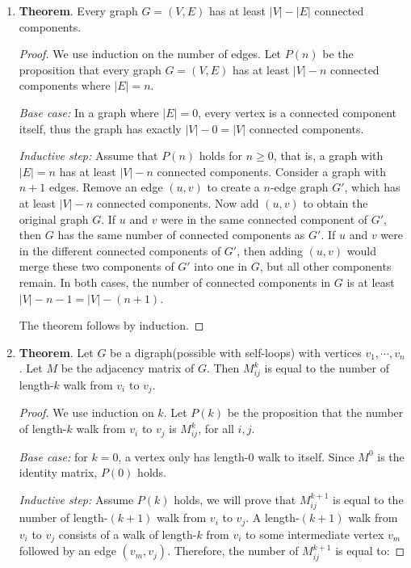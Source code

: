 \documentclass[11pt]{article}
\begin{document}
\begin{enumerate}
  \item 
    \textbf{Theorem}. Every graph $G=(V,E)$ has at least $|V|-|E|$
    connected components.
    \begin{proof}
      We use induction on the number of edges. Let $P(n)$ be the
      proposition that every graph $G=(V,E)$ has at least $|V|-n$
      connected components where $|E|=n$. 

      \emph{Base case:} In a graph where $|E|=0$, every vertex is a
      connected component itself, thus the graph has exactly
      $|V|-0=|V|$ connected components. 

      \emph{Inductive step:} Assume that $P(n)$ holds for $n \geq 0$,
      that is, a graph with $|E|=n$ has at least $|V|-n$ connected
      components. Consider a graph with $n+1$ edges. Remove an edge
      $(u,v)$ to create a $n$-edge graph $G'$, which has at least
      $|V|-n$ connected components. Now add $(u,v)$ to obtain the
      original graph $G$. If
      $u$ and $v$ were in the same connected component of $G'$, then
      $G$ has the same number of connected components as $G'$. If $u$
      and $v$ were in the different connected components of $G'$, then
      adding $(u,v)$ would merge these two components of $G'$ into one in
      $G$, but all other components remain. In both cases, the number
      of connected components in $G$ is at least $|V|-n-1=|V|-(n+1)$.

      The theorem follows by induction. 
    \end{proof}

  \item
    \textbf{Theorem}. Let $G$ be a digraph(possible with self-loops)
    with vertices $v_1, \cdots, v_n$. Let $M$ be the adjacency matrix
    of $G$. Then $M_{ij}^k$ is equal to the number of length-$k$ walk
    from $v_i$ to $v_j$.
    \begin{proof}
      We use induction on $k$. Let $P(k)$ be the proposition that the
      number of length-$k$ walk from $v_i$ to $v_j$ is $M_{ij}^k$, for
      all $i,j$. 

      \emph{Base case:} for $k=0$, a vertex only has length-$0$ walk
      to itself. Since $M^0$ is the identity matrix, $P(0)$ holds. 

      \emph{Inductive step:} Assume $P(k)$ holds, we will prove that
      $M_{ij}^{k+1}$ is equal to the number of length-$(k+1)$ walk
      from $v_i$ to $v_j$. A length-$(k+1)$ walk from $v_i$ to $v_j$
      consists of a walk of length-$k$ from $v_i$ to some intermediate
      vertex $v_m$ followed by an edge $(v_m, v_j)$. Therefore, the
      number of $M_{ij}^{k+1}$ is equal to:


\end{proof}
\end{enumerate}
\end{document}
